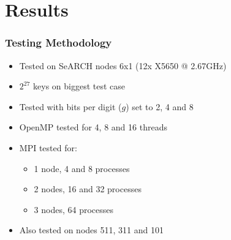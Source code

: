\section{Results}

\begin{frame}
	\frametitle{Testing Methodology}

\begin{itemize}\itemsep=10pt
		\item Tested on SeARCH nodes 6x1 (12x X5650 @ 2.67GHz)
		\item $2^{27}$ keys on biggest test case
		\item Tested with bits per digit ($g$) set to 2, 4 and 8
		\item OpenMP tested for 4, 8 and 16 threads
		\item MPI tested for:
		\begin{itemize}
			\item 1 node, 4 and 8 processes
			\item 2 nodes, 16 and 32 processes
			\item 3 nodes, 64 processes
		\end{itemize}

		\item Also tested on nodes 511, 311 and 101
	\end{itemize}

\end{frame}
